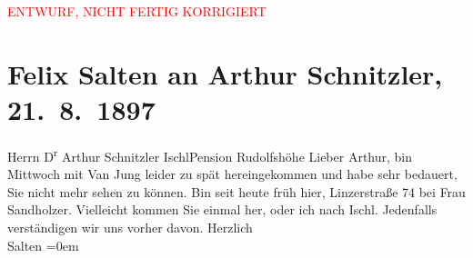 
\begin{center}
            \textcolor{red}{ENTWURF, NICHT FERTIG KORRIGIERT}
                      \end{center}
            
         
         \renewcommand{\erwaehntePersonen}{Personen: Maria Sandholzer, Leo Van-Jung}
         \renewcommand{\erwaehnteOrte}{Orte: Bad Ischl, Hotel und Pension Rudolfshöhe (Leopold Petter), Linzer Gasse, Salzburg}
         \renewcommand{\erwaehnteWerke}{}
               \section[Felix Salten an Arthur Schnitzler, 21. 8. 1897]{ Felix Salten an Arthur Schnitzler, 21. 8. 1897}\nopagebreak{}\rehead{ }\begin{ledgroupsized}[t]{13cm}\normalsize\beginnumbering \toendnotes[C]{\smallbreak\pagebreak[2]} 
\pstart{}{\pb}Herrn D\textsuperscript{r} Arthur Schnitzler \pend{}\pstart{}Ischl\pend{}\pstart{}Pension Rudolfshöhe\pend{}{\bigskip}\pstart
           \noindent{}{\pb}Lieber Arthur, bin Mittwoch mit Van Jung leider zu spät hereingekommen und habe sehr bedauert, Sie
               nicht mehr sehen zu können. Bin seit heute früh hier, Linzerstraße 74 bei Frau Sandholzer.\pend
           \pstart
           Vielleicht kommen Sie einmal her, oder ich nach Ischl. Jedenfalls verständigen wir uns vorher davon. \pend
           \pstart
           Herzlich {\\[\baselineskip]}\spacefill\mbox{Salten}\pend
           \leftskip=0em{}
         
         \endnumbering{}\end{ledgroupsized}\begin{anhang}\end{anhang}\newcommand{\dateiname}{L03272}\newcommand{\titel}{Felix Salten an Arthur Schnitzler, 21. 8. 1897}\newcommand{\editorInnen}{Martin Anton Müller und Laura Untner}
      